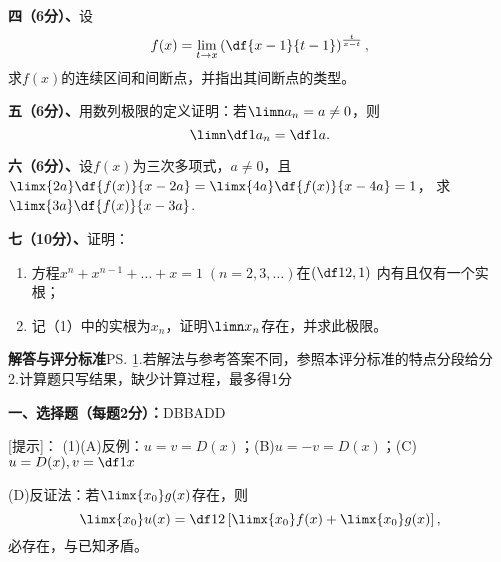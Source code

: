 
{\bf 四（6分）、}设
$$f(x)=\lim\limits_{t\to x}\left(\df{x-1}{t-1}\right)^{\frac{t}{x-t}},$$
求$f(x)$的连续区间和间断点，并指出其间断点的类型。

{\bf 五（6分）、}用数列极限的定义证明：若$\limn a_n=a\ne0$，则
$$\limn\df1{a_n}=\df1a.$$


{\bf 六（6分）、}设$f(x)$为三次多项式，$a\ne 0$，且
$\limx{2a}\df{f(x)}{x-2a}=\limx{4a}\df{f(x)}{x-4a}=1$，
求$\limx{3a}\df{f(x)}{x-3a}$.

{\bf 七（10分）、}证明：
\begin{enumerate}[(1)]
  \setlength{\itemindent}{1cm}
  \item 方程$x^n+x^{n-1}+\ldots+x=1\;(n=2,3,\ldots)$在$\left(\df12,1\right)$
  内有且仅有一个实根；
  \item 记（1）中的实根为$x_n$，证明$\limn x_n$存在，并求此极限。
\end{enumerate}

\newpage

\begin{center}
	{\Large\bf 解答与评分标准}\ps{\b 1.若解法与参考答案不同，参照本评分标准的特点分段给分\\
	2.计算题只写结果，缺少计算过程，最多得1分}
\end{center}

{\bf 一、选择题（每题2分）：}\quad D\quad B\quad B\quad A\quad D\quad D

[提示]：
(1)\;(A)反例：$u=v=D(x)$；(B)$u=-v=D(x)$；(C)$u=D(x),v=\df1x$

(D)反证法：若$\limx{x_0}g(x)$存在，则
$$\limx{x_0}u(x)=\df12\left[\limx{x_0}f(x)+\limx{x_0}g(x)\right],$$
必存在，与已知矛盾。

